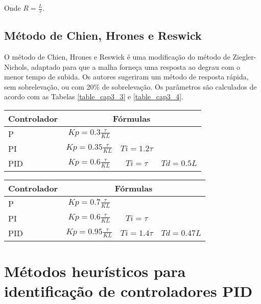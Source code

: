     Onde $R = \frac{L}{\tau}$.
    
    \subsection{Método de Chien, Hrones e Reswick}
        
        O método de Chien, Hrones e Reswick é uma modificação do método
        de Ziegler-Nichols, adaptado para que a malha forneça uma resposta ao
        degrau com o menor tempo de subida. Os autores sugeriram um método
        de resposta rápida, sem sobrelevação, ou com 20\% de sobrelevação.
	Os parâmetros são calculados de acordo com as Tabelas \ref{table_cap3_3}
	e \ref{table_cap3_4}.
        
        \begin{center}
            \begin{tabular}{l*{3}{c}}
	    \label{table_cap3_3}
Controlador & \multicolumn{3}{c}{Fórmulas} \\
\hline
P   & $Kp = 0.3\frac{\tau}{KL}$     &              & \\
PI  & $Kp = 0.35\frac{\tau}{KL}$ & $Ti = 1.2\tau$ & \\
PID & $Kp = 0.6\frac{\tau}{KL}$ & $Ti = \tau$ & $Td = 0.5L$ \\
            \end{tabular}
        \end{center}

        \newpage

        \begin{center}
            \begin{tabular}{l*{3}{c}}
	    \label{table_cap3_4}
Controlador & \multicolumn{3}{c}{Fórmulas} \\
\hline
P   & $Kp = 0.7\frac{\tau}{KL}$     &              & \\
PI  & $Kp = 0.6\frac{\tau}{KL}$ & $Ti = \tau$ & \\
PID & $Kp = 0.95\frac{\tau}{KL}$ & $Ti = 1.4\tau$ & $Td = 0.47L$ \\
            \end{tabular}
        \end{center}


\section{Métodos heurísticos para identificação de controladores PID}

